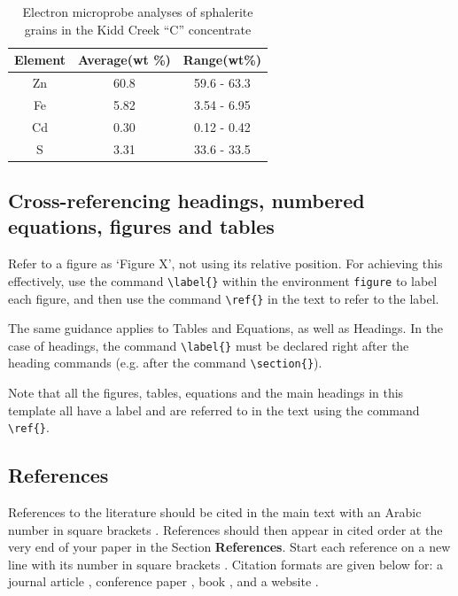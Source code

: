 \documentclass[a4paper, times, 10pt, twocolumn, twoside]{article}
\begin{document}
\begin{table}[!htb]
    \centering
    \caption{Electron microprobe analyses of sphalerite grains in the Kidd Creek ``C'' concentrate}
    \label{tab_1}
    \begin{tabular}{ccc}
    \hline
    Element & Average(wt \%) & Range(wt\%)\\
    \hline
    Zn	&60.8	&59.6 - 63.3\\
    Fe	&5.82	&3.54 - 6.95\\
    Cd	&0.30	&0.12 - 0.42\\
    S	&3.31	&33.6 - 33.5\\
    \hline
    \end{tabular}
\end{table}


\subsection{Cross-referencing headings, numbered equations, figures and tables}

Refer to a figure as `Figure X', not using its relative position.
For achieving this effectively, use the command \verb|\label{}| within the environment \verb|figure| to label each figure, and then use the command \verb|\ref{}| in the text to refer to the label.

The same guidance applies to Tables and Equations, as well as Headings.
In the case of headings, the command \verb|\label{}| must be declared right after the heading commands (e.g. after the command \verb|\section{}|).

Note that all the figures, tables, equations and the main headings in this template all have a label and are referred to in the text using the command \verb|\ref{}|.


\subsection{References}

References to the literature should be cited in the main text with an Arabic number in square brackets \cite{Ha_2012}. 
References should then appear in cited order at the very end of your paper in the Section \textbf{References}. 
Start each reference on a new line with its number in square brackets \cite{Ha_2012}. 
Citation formats are given below for: a journal article \cite{Ha_2012}, conference paper \cite{Kwok_2012}, book \cite{Book}, and a website \cite{Website}.
\end{document}
